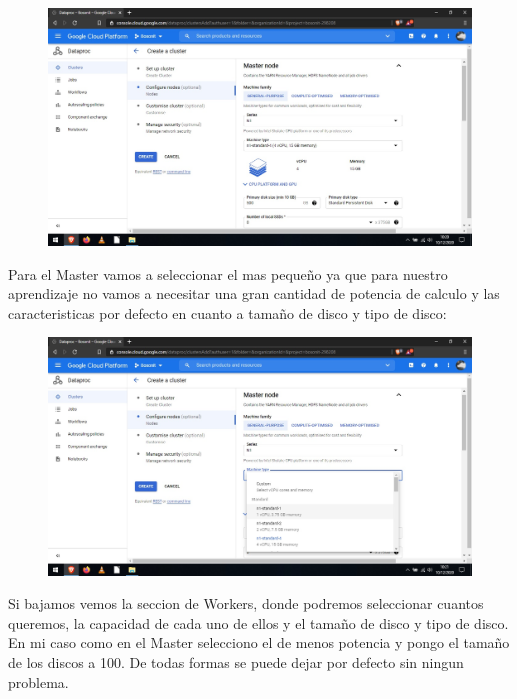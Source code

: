 \documentclass[a4paper,10pt]{article}
\begin{document}
\begin{figure}[H]
\begin{center}
\includegraphics[width=500pt]{./fotos/GoogleCloud/27 - GC.jpg}
\end{center}
\end{figure}

Para el Master vamos a seleccionar el mas pequeño ya que para nuestro aprendizaje no vamos a necesitar una gran cantidad de potencia de calculo y las caracteristicas por defecto en cuanto a tamaño de disco y tipo de disco:

\begin{figure}[H]
\begin{center}
\includegraphics[width=500pt]{./fotos/GoogleCloud/28 - GC.jpg}
\end{center}
\end{figure}

Si bajamos vemos la seccion de Workers, donde podremos seleccionar cuantos queremos, la capacidad de cada uno de ellos y el tamaño de disco y tipo de disco. En mi caso como en el Master selecciono el de menos potencia y pongo el tamaño de los discos a 100. De todas formas se puede dejar por defecto sin ningun problema.
\end{document}
